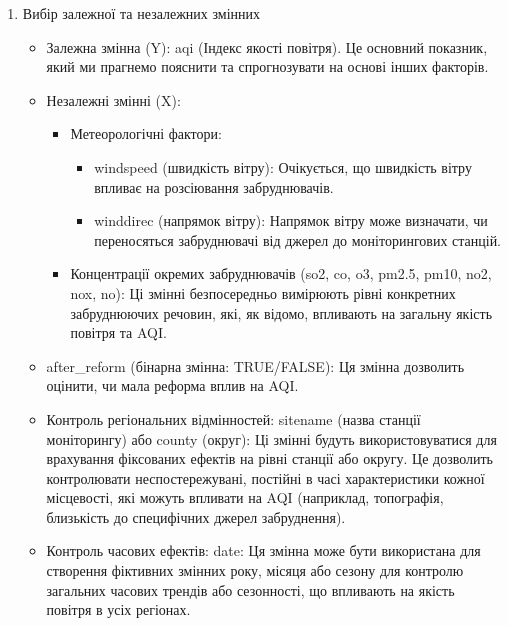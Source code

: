 \documentclass{article}
\begin{document}
\begin{enumerate}
    \item Вибір залежної та незалежних змінних
    \begin{itemize}
        \item Залежна змінна (Y): aqi (Індекс якості повітря). Це основний показник, який ми прагнемо пояснити та спрогнозувати на основі інших факторів.
        \item Незалежні змінні (X):
        \begin{itemize}
            \item Метеорологічні фактори:
            \begin{itemize}
                \item windspeed (швидкість вітру): Очікується, що швидкість вітру впливає на розсіювання забруднювачів.
                \item winddirec (напрямок вітру): Напрямок вітру може визначати, чи переносяться забруднювачі від джерел до моніторингових станцій.
            \end{itemize}
            \item Концентрації окремих забруднювачів (so2, co, o3, pm2.5, pm10, no2, nox, no):
            Ці змінні безпосередньо вимірюють рівні конкретних забруднюючих речовин, які, як відомо, впливають на загальну якість повітря та AQI.
        \end{itemize}
        \item after\_reform (бінарна змінна: TRUE/FALSE): Ця змінна дозволить оцінити, чи мала реформа вплив на AQI.
        \item Контроль регіональних відмінностей: sitename (назва станції моніторингу) або county (округ): Ці змінні будуть використовуватися для врахування фіксованих ефектів на рівні станції або округу. Це дозволить контролювати неспостережувані, постійні в часі характеристики кожної місцевості, які можуть впливати на AQI (наприклад, топографія, близькість до специфічних джерел забруднення).
        \item Контроль часових ефектів: date: Ця змінна може бути використана для створення фіктивних змінних року, місяця або сезону для контролю загальних часових трендів або сезонності, що впливають на якість повітря в усіх регіонах.
    \end{itemize}


\end{enumerate}
\end{document}
